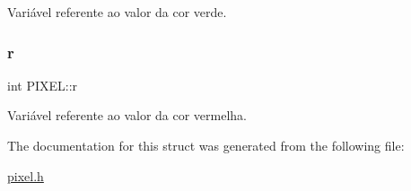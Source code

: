 Variável referente ao valor da cor verde. \mbox{\label{structPIXEL_ab6ca89f5882386162fc799c387d4be19}} 
\subsubsection{\texorpdfstring{r}{r}}
{\footnotesize\ttfamily int P\+I\+X\+E\+L\+::r}

Variável referente ao valor da cor vermelha. 

The documentation for this struct was generated from the following file\+:\begin{DoxyCompactItemize}
\item 
\hyperlink{pixel_8h}{pixel.\+h}\end{DoxyCompactItemize}

